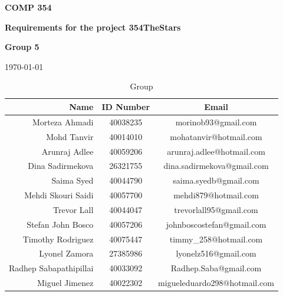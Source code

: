 \documentclass[11pt]{article}
\begin{document}
                \vspace*{0.5in}
                \centerline{\bf\Large COMP 354}
                \centerline{\bf\Large Requirements for the project 354TheStars}

                \vspace*{0.5in}
                \centerline{\bf\Large Group 5}

                \vspace*{0.5in}
                \centerline{\today}

                \begin{table}[htbp]
                    \caption{Group}
                    \begin{center}
                        \begin{tabular}{|r | c| c |}
                            \hline
                            Name & ID Number & Email \\
                            \hline
                            Morteza Ahmadi & 40038235 & morinob93@gmail.com \\
                            \hline
                            Mohd Tanvir & 40014010 & mohatanvir@hotmail.com \\
                            \hline
                            Arunraj Adlee & 40059206 & arunraj.adlee@hotmail.com \\
                            \hline
                            Dina Sadirmekova & 26321755 & dina.sadirmekova@gmail.com \\
                            \hline
                            Saima Syed & 40044790 & saima.syedb@gmail.com \\
                            \hline
                            Mehdi Skouri Saidi & 40057700 & mehdi879@hotmail.com \\
                            \hline
                            Trevor Lall & 40044047 & trevorlall95@gmail.com \\
                            \hline
                            Stefan John Bosco & 40057206 & johnboscostefan@gmail.com \\
                            \hline
                            Timothy Rodriguez & 40075447 & timmy\_258@hotmail.com \\
                            \hline
                            Lyonel Zamora & 27385986 & lyonelz516@gmail.com \\
                            \hline
                            Radhep Sabapathipillai & 40033092 & Radhep.Saba@gmail.com \\
                            \hline
                            Miguel Jimenez & 40022302 & migueleduardo298@hotmail.com\\
                            \hline
                        \end{tabular}
                    \end{center}
                \end{table}
\end{document}
